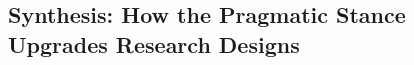 \subsection{Synthesis: How the Pragmatic Stance Upgrades Research Designs}
\label{sec:pl-synthesis}

